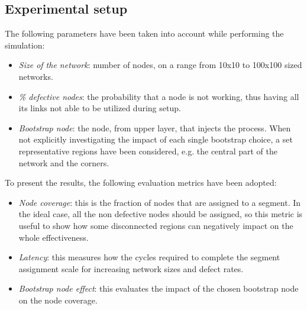 \subsection{Experimental setup}
The following parameters have been taken into account while
performing the \disr{} simulation:
\begin{itemize}
\item {\emph{Size of the network}}: number of nodes, on a range from
10x10 to 100x100 sized networks. 
\item {\emph{\% defective nodes}}: the probability that a node is not
working, thus having all its links not able to be utilized during \disr{} setup.  
\item {\emph{Bootstrap node}}: the node, from upper layer, that
injects the \disr{} process. When not explicitly investigating the
impact of each single bootstrap choice, a set representative regions have been
considered, e.g. the central part of the network and the corners.
\end{itemize}
To present the results, the following evaluation metrics have been adopted:
\begin{itemize}
\item{\emph{Node coverage}}: this is the fraction of nodes that
are assigned to a segment. In the ideal case, all the non defective
nodes should be assigned, so this metric is useful to show how some
disconnected regions can negatively impact on the whole \disr{}
effectiveness.
\item{\emph{Latency}}: this measures how the cycles required to complete the
segment assignment scale for increasing network sizes and defect rates.
\item{\emph{Bootstrap node effect}}: this evaluates the impact of the chosen
bootstrap node on the node coverage.
\end{itemize}


